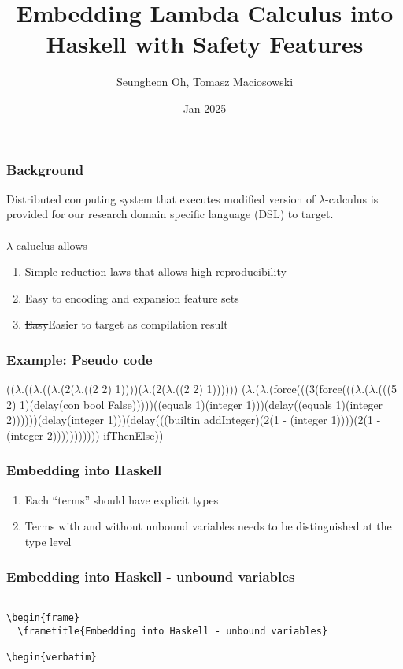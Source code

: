 \documentclass{beamer}
\title{Embedding Lambda Calculus into Haskell with Safety Features}
\author{Seungheon Oh, Tomasz Maciosowski}
\institute{MLabs}
\date{Jan 2025}
\begin{document}
\frame{\titlepage}

\begin{frame}
  \frametitle{Background}
  Distributed computing system that executes modified version of $\lambda$-calculus is provided for our research domain specific language (DSL) to target. \\~\\

  $\lambda$-caluclus allows
  \begin{enumerate}
  \item
    Simple reduction laws that allows high reproducibility
  \item
    Easy to encoding and expansion feature sets
  \item
    \sout{Easy}Easier to target as compilation result
  \end{enumerate}

\end{frame}

\begin{frame}[fragile]
  \frametitle{Example: Pseudo code}
  (($\lambda .$(($\lambda .$(($\lambda .$(2($\lambda .$((2 2) 1))))($\lambda .$(2($\lambda .$((2 2) 1))))))
  ($\lambda .$($\lambda .$(force(((3(force((($\lambda .$($\lambda .$(((5 2) 1)(delay(con bool False)))))((equals 1)(integer 1)))(delay((equals 1)(integer 2))))))(delay(integer 1)))(delay(((builtin addInteger)(2(1 - (integer 1))))(2(1 - (integer 2))))))))))) ifThenElse))
\end{frame}

\begin{frame}
  \frametitle{Embedding into Haskell}
  \begin{enumerate}
  \item
    Each ``terms'' should have explicit types
  \item
    Terms with and without unbound variables needs to be distinguished at the type level
  \end{enumerate}
\end{frame}

\begin{frame}
  \frametitle{Embedding into Haskell - unbound variables}

\begin{verbatim}

\begin{frame}
  \frametitle{Embedding into Haskell - unbound variables}

\begin{verbatim}

\end{verbatim}
\end{frame}
\end{document}

